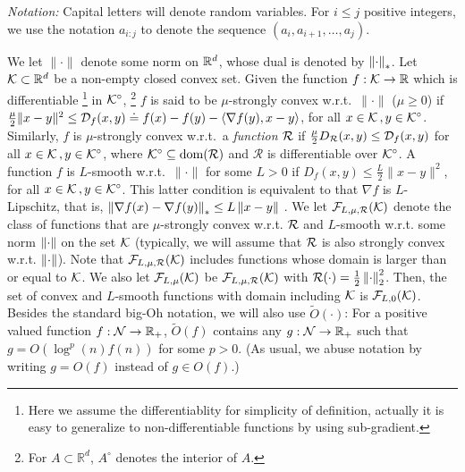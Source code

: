 
\textit{Notation:} Capital letters will denote random variables.
For $i\le j$ positive integers,
 we use the notation $a_{i:j}$ to denote
 the sequence $(a_i,a_{i+1}, \dots, a_{j})$.

 We let $\| \cdot \|$ denote some norm on $\mathbb{R}^d$, whose dual is denoted by $\left\|\cdot\right\|_*$. 
 Let $\mathcal{K} \subset \mathbb{R}^d$ be a non-empty closed convex  set. 
 Given the function $f:\mathcal{K} \to \mathbb{R}$ which is differentiable%
\footnote{Here we assume the differentiablity for simplicity of definition, actually it is easy to generalize to non-differentiable functions by using sub-gradient.} 
  in $\mathcal{K}^\circ$,%
  \footnote{For $A\subset \mathbb{R}^d$, $A^\circ$ denotes the interior of $A$.}
 $f$ is said to be $\mu$-strongly convex w.r.t.\  $\| \cdot \|$  ($\mu\ge 0$) if
 $\tfrac{\mu}{2} \|x-y\|^2 \le \mathcal{D}_f(x,y)\doteq f(x)-f(y)-\langle \nabla f(y),x-y \rangle$, for all $x \in \mathcal{K} \,, y \in \mathcal{K}^\circ$.
Similarly, $f$ is $\mu$-strongly convex w.r.t.\  a \emph{function} $\mathcal{R}$
	if $\tfrac{\mu}{2}D_{\mathcal{R}}(x,y)\le\mathcal{D}_f(x,y)$ for all $x \in \mathcal{K} \,, y \in \mathcal{K}^\circ$, where $\mathcal{K}^\circ\subseteq \operatorname{dom}(\mathcal{R})$ and $\mathcal{R}$ is differentiable over $\mathcal{K}^\circ$.
 A function $f$ is $L$-smooth w.r.t.\  $\| \cdot \| $ for some $L>0$ if
$D_f(x,y) \le \tfrac{L}{2} \|x-y\|^2$, for all $x \in \mathcal{K} \,, y \in \mathcal{K}^\circ$.
 This latter condition is equivalent to that $\nabla f$ is $L$-Lipschitz, that is, 
 $\left\|\nabla f(x) - \nabla f(y)\right\|_* \le L \left\|x-y\right\|$ \citep[Theorem~2.1.5]{nesterov2004introductory}.
 We let $\mathcal{F}_{L,\mu, \mathcal{R}}(\mathcal{K})$ denote the class of functions that are $\mu$-strongly convex w.r.t. $\mathcal{R}$ and $L$-smooth w.r.t. some norm $\left\|\cdot\right\|$ on the set $\mathcal{K}$ (typically, we will assume that $\mathcal{R}$ is also strongly convex w.r.t. $\left\|\cdot\right\|$).
 Note that $\mathcal{F}_{L,\mu,\mathcal{R}}(\mathcal{K})$ includes functions whose domain is larger than or equal to $\mathcal{K}$.
We also let $\mathcal{F}_{L,\mu}(\mathcal{K})$ be $\mathcal{F}_{L,\mu,\mathcal{R}}(\mathcal{K})$ with $\mathcal{R}(\cdot) = \frac12 \left\|\cdot\right\|_2^2$.
Then, the set of convex and $L$-smooth functions with domain including $\mathcal{K}$ is  $\mathcal{F}_{L,0}(\mathcal{K})$.
Besides the standard big-Oh notation, we will also use $\tilde{O}(\cdot)$:
For a positive valued function $f: \mathcal{N} \to \mathbb{R}_+$, $\tilde{O}(f)$ contains any $g:\mathcal{N} \to \mathbb{R}_+$ such that
$g =O( \log^p(n) f(n) )$ for some $p>0$.
(As usual, we abuse notation by writing $g= O(f)$ instead of $g\in O(f)$.)

